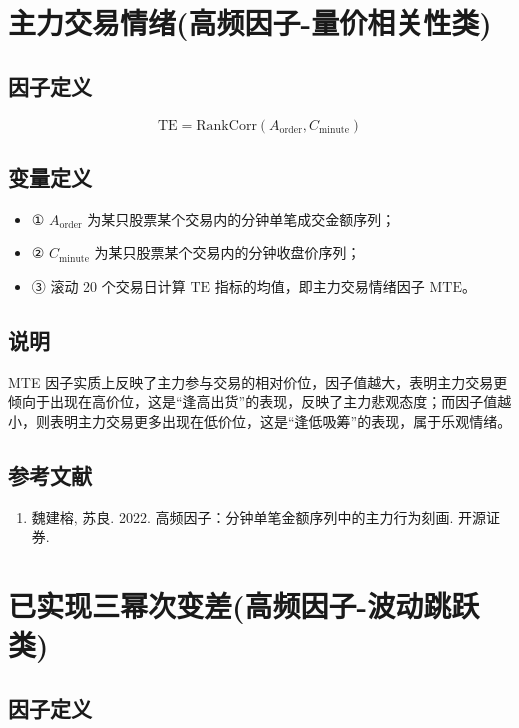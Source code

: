 \documentclass{article}
\begin{document}
\section{主力交易情绪(高频因子-量价相关性类)}

\subsection{因子定义}
\begin{equation}
    \mathrm{TE} = \mathrm{RankCorr}(A_{\mathrm{order}}, C_{\mathrm{minute}})
\end{equation}

\subsection{变量定义}
\begin{itemize}
    \item ① \( A_{\mathrm{order}} \) 为某只股票某个交易内的分钟单笔成交金额序列；
    \item ② \( C_{\mathrm{minute}} \) 为某只股票某个交易内的分钟收盘价序列；
    \item ③ 滚动 20 个交易日计算 \( \mathrm{TE} \) 指标的均值，即主力交易情绪因子 \( \mathrm{MTE} \)。
\end{itemize}

\subsection{说明}
MTE 因子实质上反映了主力参与交易的相对价位，因子值越大，表明主力交易更倾向于出现在高价位，这是“逢高出货”的表现，反映了主力悲观态度；而因子值越小，则表明主力交易更多出现在低价位，这是“逢低吸筹”的表现，属于乐观情绪。

\subsection{参考文献}
\begin{enumerate}
    \item 魏建榕, 苏良. 2022. 高频因子：分钟单笔金额序列中的主力行为刻画. 开源证券.
\end{enumerate}

\section{已实现三幂次变差(高频因子-波动跳跃类)}

\subsection{因子定义}
\end{document}
